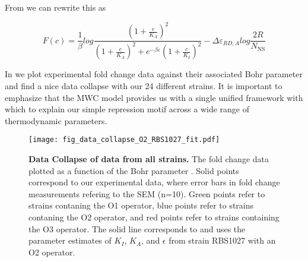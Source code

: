 From \eref[eq6v2] we can rewrite this as

\begin{equation}\label{eq10}
F(c) = \frac{1}{\beta} log \frac{\left(1+\frac{c}{K_A}\right)^2}{\left(1+\frac{c}{K_A}\right)^2+e^{-\beta  \varepsilon }\left(1+\frac{c}{K_I}\right)^2} - \Delta\varepsilon_{RD,A} log \frac{2R}{N_{\text{NS}}} 
\end{equation}

In  we plot experimental fold change data against their associated Bohr parameter and find a nice data collapse with our 24 different strains. It is important to emphasize that the MWC model provides us with a single unified framework with which to explain our simple repression motif across a wide range of thermodynamic parameters.

\begin{figure}[h]
	\centering \texttt{[image: fig\_data\_collapse\_O2\_RBS1027\_fit.pdf]}
	\caption{{\bf Data Collapse of data from all strains.} The fold change data plotted as a function of the Bohr parameter \eref[eq10].  Solid points correspond to our experimental data, where error bars in fold change measurements refering to the SEM (n=10). Green points refer to strains contaning the O1 operator, blue points refer to strains contaning the O2 operator, and red points refer to strains containing the O3 operator. The solid line corresponds to \eref[eq10] and uses the parameter estimates of $K_I$, $K_A$, and $\epsilon$ from strain RBS1027 with an O2 operator.}
	\label{fig_result3}
\end{figure}



